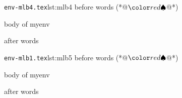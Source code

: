 \begin{minipage}{.45\linewidth}
\begin{cmhlistings}[escapeinside={(*@}{@*)}]{\texttt{env-mlb4.tex}}{lst:mlb4}
before words (*@$\BeginStartsOnOwnLine$@*)
\begin{myenv}  %
body of myenv%
\end{myenv}%
after words
\end{cmhlistings}
\end{minipage}%
\hfill
\begin{minipage}{.45\linewidth}
\begin{cmhlistings}[escapeinside={(*@}{@*)}]{\texttt{env-mlb1.tex}}{lst:mlb5}
before words (*@$\BeginStartsOnOwnLine$@*)


\begin{myenv}  %


body of myenv%


\end{myenv}%

after words
\end{cmhlistings}
\end{minipage}%
